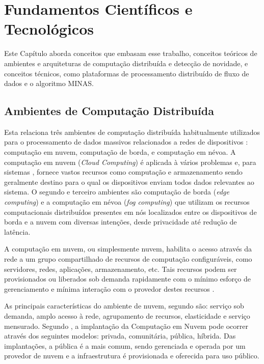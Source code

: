 
\chapter{Fundamentos Científicos e Tecnológicos}\label{cha:fundamentos}

Este Capítulo aborda conceitos que embasam esse trabalho,
conceitos teóricos de
ambientes e arquiteturas de computação distribuída e detecção de novidade,
e conceitos técnicos, como plataformas de processamento distribuído de fluxo
de dados e o algoritmo MINAS.

\section{Ambientes de Computação Distribuída}

Esta \Section relaciona três ambientes de computação distribuída habitualmente
utilizados para o processamento de dados massivos relacionados a redes de
dispositivos \iot: computação em nuvem, computação de borda, e computação em névoa.
A computação em nuvem (\emph{Cloud Computing}) é aplicada à vários problemas e,
para sistemas \iot, fornece vastos recursos como computação e armazenamento
sendo geralmente destino para o qual os dispositivos \iot enviam todos dados
relevantes ao sistema.
O segundo e terceiro ambientes são computação de borda (\emph{edge computing})
e a computação em névoa (\emph{fog computing}) que utilizam os recursos
computacionais distribuídos presentes em nós localizados entre os dispositivos
de borda e a nuvem com diversas 
intenções, desde privacidade até redução de latência.


A computação em nuvem, ou simplesmente nuvem, habilita o acesso através da rede
a um grupo compartilhado de recursos de computação configuráveis, como
servidores, redes, aplicações, armazenamento, etc.
Tais recursos podem ser provisionados ou liberados sob
demanda rapidamente com o mínimo esforço de gerenciamento
e mínima interação com o provedor destes recursos \cite{NIST2011}.

As principais características do ambiente de nuvem, segundo 
são: serviço sob demanda, amplo acesso à rede, agrupamento de recursos,
elasticidade e serviço mensurado.
Segundo , a implantação da Computação em Nuvem pode
ocorrer através dos seguintes modelos: privada, comunitária, pública, híbrida.
Das implantações, a pública é a mais comum, sendo gerenciada e operada por um
provedor de nuvem e a infraestrutura é provisionada e oferecida para uso
público.

